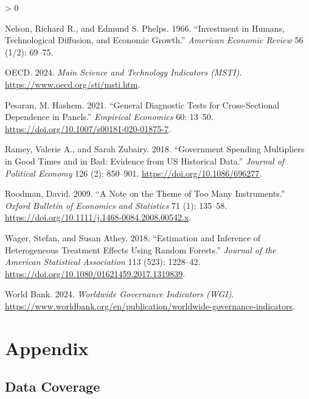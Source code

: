 \documentclass[
  11pt,
]{article}
\newlength{\cslhangindent}
\newenvironment{CSLReferences}[2] %
 {%
  \setlength{\parindent}{0pt}
  \ifodd #1 \everypar{\setlength{\hangindent}{\cslhangindent}}\ignorespaces\fi
  \ifnum #2 > 0
  \setlength{\parskip}{#2\baselineskip}
  \fi
 }%
 {}
\begin{document}
\begin{CSLReferences}{1}{0}
\leavevmode{}%
Nelson, Richard R., and Edmund S. Phelps. 1966. {``Investment in Humans, Technological Diffusion, and Economic Growth.''} \emph{American Economic Review} 56 (1/2): 69--75.

\leavevmode{}%
OECD. 2024. \emph{Main Science and Technology Indicators ({MSTI})}. \url{https://www.oecd.org/sti/msti.htm}.

\leavevmode{}%
Pesaran, M. Hashem. 2021. {``General Diagnostic Tests for Cross-Sectional Dependence in Panels.''} \emph{Empirical Economics} 60: 13--50. \url{https://doi.org/10.1007/s00181-020-01875-7}.

\leavevmode{}%
Ramey, Valerie A., and Sarah Zubairy. 2018. {``Government Spending Multipliers in Good Times and in Bad: Evidence from {US} Historical Data.''} \emph{Journal of Political Economy} 126 (2): 850--901. \url{https://doi.org/10.1086/696277}.

\leavevmode{}%
Roodman, David. 2009. {``A Note on the Theme of Too Many Instruments.''} \emph{Oxford Bulletin of Economics and Statistics} 71 (1): 135--58. \url{https://doi.org/10.1111/j.1468-0084.2008.00542.x}.

\leavevmode{}%
Wager, Stefan, and Susan Athey. 2018. {``Estimation and Inference of Heterogeneous Treatment Effects Using Random Forests.''} \emph{Journal of the American Statistical Association} 113 (523): 1228--42. \url{https://doi.org/10.1080/01621459.2017.1319839}.

\leavevmode{}%
World Bank. 2024. \emph{Worldwide Governance Indicators ({WGI})}. \url{https://www.worldbank.org/en/publication/worldwide-governance-indicators}.

\end{CSLReferences}

\newpage

\hypertarget{appendix}{%
\section*{Appendix}\label{appendix}}

\hypertarget{data-coverage}{%
\subsection*{Data Coverage}\label{data-coverage}}
\end{document}
